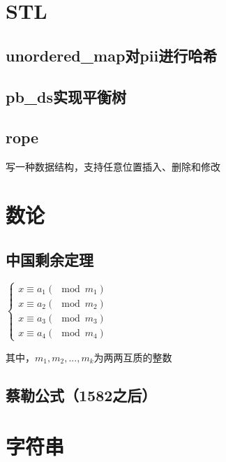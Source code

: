 \documentclass[landscape,twocolumn,twoside,a4paper]{article}
\begin{document}
\section{STL}

\subsection{unordered\_map对pii进行哈希}


\subsection{pb\_ds实现平衡树}


\subsection{rope}
写一种数据结构，支持任意位置插入、删除和修改



\section{数论}

\subsection{中国剩余定理}
$\left\{\begin{matrix} x \equiv a_{1} (\mod m_{1})\\ x \equiv a_{2} (\mod m_{2})\\  x \equiv a_{3} (\mod m_{3})\\  x \equiv a_{4} (\mod m_{4})\end{matrix}\right.$ \par
其中，$m_1,m_2,...,m_k$为两两互质的整数


\subsection{蔡勒公式（1582之后）}



\section{字符串}
\end{document}
